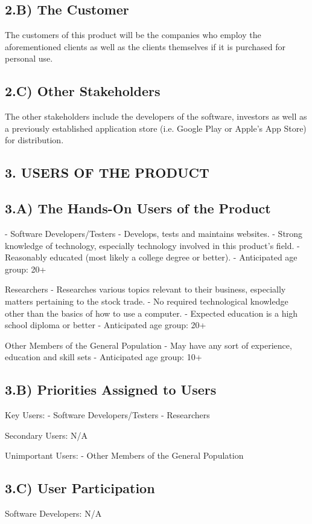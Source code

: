 \documentclass[12pt]{article}
\begin{document}
\subsection*{2.B) The Customer}
The customers of this product will be the companies who employ the aforementioned clients as well as the clients themselves if it is purchased for personal use.

\subsection*{2.C) Other Stakeholders}
The other stakeholders include the developers of the software, investors as well as a previously established application store (i.e. Google Play or Apple’s App Store) for distribution.

\subsection*{3. USERS OF THE PRODUCT}

\subsection*{3.A) The Hands-On Users of the Product}
- Software Developers/Testers
- Develops, tests and maintains websites.
- Strong knowledge of technology, especially technology involved in this product’s field.
- Reasonably educated (most likely a college degree or better).
- Anticipated age group: 20+

Researchers
- Researches various topics relevant to their business, especially matters pertaining to the stock trade.
- No required technological knowledge other than the basics of how to use a computer.
- Expected education is a high school diploma or better
- Anticipated age group: 20+

Other Members of the General Population
- May have any sort of experience, education and skill sets
- Anticipated age group: 10+


\subsection*{3.B) Priorities Assigned to Users}
Key Users:
- Software Developers/Testers
- Researchers

Secondary Users:
N/A

Unimportant Users:
- Other Members of the General Population

\subsection*{3.C) User Participation}
Software Developers:
N/A
\end{document}
